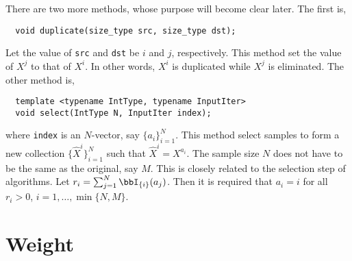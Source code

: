 There are two more methods, whose purpose will become clear later. The first
is,
\begin{Verbatim}
  void duplicate(size_type src, size_type dst);
\end{Verbatim}
Let the value of \verb|src| and \verb|dst| be $i$ and $j$, respectively. This
method set the value of $X^j$ to that of $X^i$. In other words, $X^i$ is
duplicated while $X^j$ is eliminated. The other method is,
\begin{Verbatim}
  template <typename IntType, typename InputIter>
  void select(IntType N, InputIter index);
\end{Verbatim}
where \verb|index| is an $N$-vector, say $\{a_i\}_{i=1}^N$. This method select
samples to form a new collection $\{\hat{X}^i\}_{i=1}^N$ such that $\hat{X}^i =
X^{a_i}$. The sample size $N$ does not have to be the same as the original, say
$M$. This is closely related to the selection step of \smc algorithms. Let $r_i
= \sum_{j = 1}^N\bbI_{\{i\}}(a_j)$. Then it is required that $a_i = i$ for all
$r_i > 0$, $i = 1,\dots,\min\{N, M\}$.

\section{Weight}
\label{sec:Weight}


